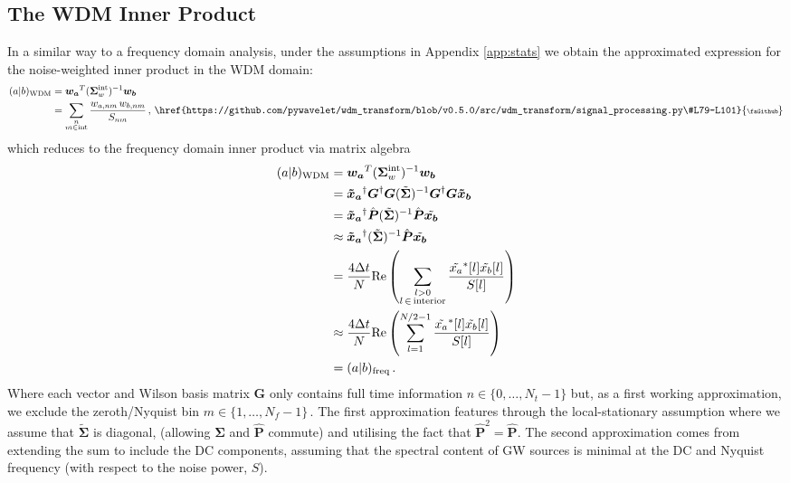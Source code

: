 \documentclass[twocolumn,preprintnumbers,
  superscriptaddress,
  nofootinbib,
  amsmath,
  amssymb,
  aps,
  prd,
  colorlinks=true,
  linkcolor=blue,
  urlcolor=blue,
  citecolor=blue,
  anchorcolor=blue
]{revtex4-2}
\DeclareRobustCommand{\codelink}[1]{\,\href{#1}{\mbox{\scalebox{0.65}{\faGithub}}}}
\begin{document}
\subsection{The WDM Inner Product}
In a similar way to a frequency domain analysis, under the assumptions in Appendix \ref{app:stats} we obtain the approximated expression for the noise-weighted inner product in the WDM domain:
\begin{align}
    (a|b)_{\mathrm{WDM}} &= \boldsymbol{w_a}^T(\boldsymbol{\Sigma}_w^{\rm int})^{-1}\boldsymbol{w_b} \\
    & = \sum_{\substack{n \\ m\in\mathrm{int}}} \frac{w_{a,nm}\,w_{b,nm}} {S_{nm}}\,,\label{eq:wdm_inner}\codelink{https://github.com/pywavelet/wdm_transform/blob/v0.5.0/src/wdm_transform/signal_processing.py\#L79-L101}
\end{align}
%
which reduces to the frequency domain inner product via matrix algebra
%
\begin{align*}
    (a|b)_{\mathrm{WDM}} &= \boldsymbol{w_a}^T(\boldsymbol{\Sigma}^{\rm int}_w)^{-1}\boldsymbol{w_b}  \\ 
    &= \boldsymbol{\tilde{x}_a}^{\dagger}\boldsymbol{G}^{\dagger}\boldsymbol{G}(\tilde{\boldsymbol{\Sigma}})^{-1}\boldsymbol{G}^{\dagger}\boldsymbol{G}\boldsymbol{\tilde x_b} \\
    & = \boldsymbol{\tilde x_a}^{\dagger}\hat{\boldsymbol{P}}(\tilde{\boldsymbol{\Sigma}})^{-1}\hat{\boldsymbol{P}}\tilde{\boldsymbol{x_b}} \\
    & \approx  \boldsymbol{\tilde x_a}^{\dagger}(\tilde{\boldsymbol{\Sigma}})^{-1}\hat{\boldsymbol{P}}\tilde{\boldsymbol{x_b}}\\
    & = \frac{4\Delta t}{N} \text{Re}\left(\sum_{\substack{l> 0 \\ l\,\in\,\mathrm{interior}}}\frac{\tilde{x_a}^{*}[l]\tilde{x_b}[l]}{S[l]}\right) \\
    & \approx \frac{4\Delta t}{N} \text{Re}\left(\sum_{l=1}^{N/2 - 1}\frac{\tilde{x_a}^{*}[l]\tilde{x_b}[l]}{S[l]}\right) \\
    & = (a|b)_{\text{freq}}\,.
\end{align*}
Where each vector and Wilson basis matrix $\boldsymbol{G}$ only contains full time information $n\in \{0,\ldots,N_t-1\}$ but, as a first working approximation, we exclude the zeroth/Nyquist bin $m\in\{1,\ldots,N_f -1\}$\,. The first approximation features through the local-stationary assumption where we assume that $\tilde{\boldsymbol{\Sigma}}$ is diagonal, (allowing $\boldsymbol{\Sigma}$ and $\hat{\boldsymbol{P}}$ commute) and utilising the fact that $\hat{\boldsymbol{P}}^2 = \hat{\boldsymbol{P}}$. The second approximation comes from extending the sum to include the DC components, assuming that the spectral content of GW sources is minimal at the DC and Nyquist frequency (with respect to the noise power, $S$). 
\end{document}

